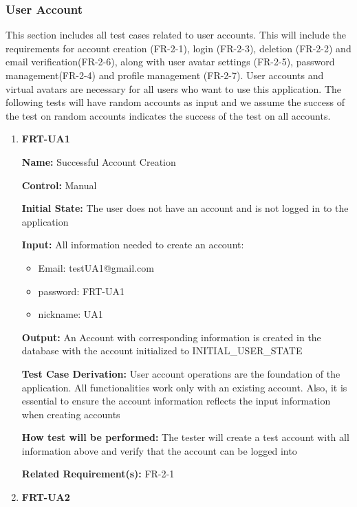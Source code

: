 \documentclass[12pt, titlepage]{article}
\begin{document}
\subsubsection{User Account}

This section includes all test cases related to user accounts. This will include the requirements for account creation (FR-2-1), login (FR-2-3), deletion (FR-2-2) and email verification(FR-2-6), along with user avatar settings (FR-2-5), password management(FR-2-4) and profile management (FR-2-7). User accounts and virtual avatars are necessary for all users who want to use this application. The following tests will have random accounts as input and we assume the success of the test on random accounts indicates the success of the test on all accounts.

\begin{enumerate}

\item{\textbf{FRT-UA1}}

\textbf{Name:} Successful Account Creation

\textbf{Control:} Manual
					
\textbf{Initial State:} The user does not have an account and is not logged in to the application

\textbf{Input:} All information needed to create an account:
\begin{itemize}
\item Email: testUA1@gmail.com
\item password: FRT-UA1
\item nickname: UA1
\end{itemize}
					
\textbf{Output:} An Account with corresponding information is created in the database with the account initialized to INITIAL\_USER\_STATE

\textbf{Test Case Derivation:}  User account operations are the foundation of the application. All functionalities work only with an existing account. Also, it is essential to ensure the account information reflects the input information when creating accounts
					
\textbf{How test will be performed:} The tester will create a test account with all information above and verify that the account can be logged into

\textbf{Related Requirement(s):} FR-2-1

\item{\textbf{FRT-UA2}}


\end{enumerate}
\end{document}
